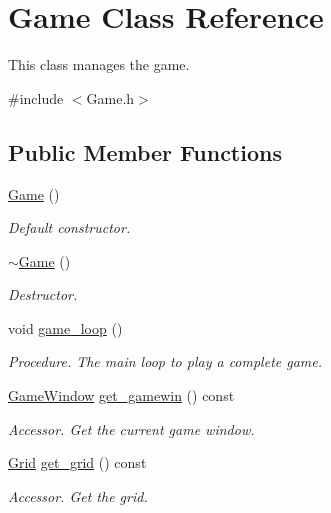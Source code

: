 \hypertarget{classGame}{}\section{Game Class Reference}
\label{classGame}


This class manages the game.  




{\ttfamily \#include $<$Game.\+h$>$}

\subsection*{Public Member Functions}
\begin{DoxyCompactItemize}
\item 
\hyperlink{classGame_ad59df6562a58a614fda24622d3715b65}{Game} ()\hypertarget{classGame_ad59df6562a58a614fda24622d3715b65}{}\label{classGame_ad59df6562a58a614fda24622d3715b65}

\begin{DoxyCompactList}\small\item\em Default constructor. \end{DoxyCompactList}\item 
\hyperlink{classGame_ae3d112ca6e0e55150d2fdbc704474530}{$\sim$\+Game} ()\hypertarget{classGame_ae3d112ca6e0e55150d2fdbc704474530}{}\label{classGame_ae3d112ca6e0e55150d2fdbc704474530}

\begin{DoxyCompactList}\small\item\em Destructor. \end{DoxyCompactList}\item 
void \hyperlink{classGame_a729bdcb8431c940cdfc5b491adf1220c}{game\+\_\+loop} ()\hypertarget{classGame_a729bdcb8431c940cdfc5b491adf1220c}{}\label{classGame_a729bdcb8431c940cdfc5b491adf1220c}

\begin{DoxyCompactList}\small\item\em Procedure. The main loop to play a complete game. \end{DoxyCompactList}\item 
\hyperlink{classGameWindow}{Game\+Window} \hyperlink{classGame_a8208536d461d053b8404e4c0dc44981f}{get\+\_\+gamewin} () const 
\begin{DoxyCompactList}\small\item\em Accessor. Get the current game window. \end{DoxyCompactList}\item 
\hyperlink{classGrid}{Grid} \hyperlink{classGame_abe6a1499b664ec09213d486c7af9d23d}{get\+\_\+grid} () const 
\begin{DoxyCompactList}\small\item\em Accessor. Get the grid. \end{DoxyCompactList}\end{DoxyCompactItemize}


